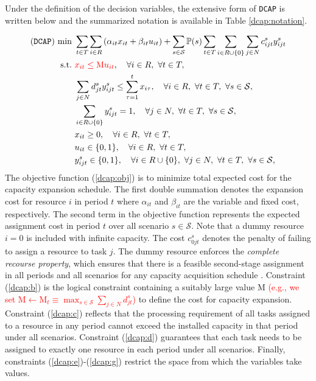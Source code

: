 Under the definition of the decision variables, the extensive form of \texttt{DCAP} is written below and the summarized notation is available in Table \ref{dcap:notation}.

\begin{subequations}
	\begin{align}
	(\texttt{DCAP})\ \textrm{min}\ &\sum_{t\in T}\sum_{i\in R}\left(\alpha_{it}x_{it}+\beta_{it}u_{it}\right)+\sum_{s\in\mathcal{S}}\PP(s)\sum_{t\in T}\sum_{i\in R\cup\{0\}}\sum_{j\in N}c_{ijt}^{s}y_{ijt}^s	\label{dcap:obj} \\
	\textrm{s.t.}\ & \textcolor{red}{x_{it}\le \textrm{M}u_{it}},\quad\forall i\in R,\ \forall t\in T,	\label{dcap:b}\\
	&\sum_{j\in N}d_{jt}^s y_{ijt}^s\le\sum_{\tau=1}^{t}x_{i\tau},\quad\forall i\in R,\ \forall t\in T,\ \forall s\in\mathcal{S},\label{dcap:c}\\
	&\sum_{i\in R\cup \{0\}}y_{ijt}^s=1,\quad\forall j\in N,\ \forall t\in T,\ \forall s\in\mathcal{S}, \label{dcap:d} \\
	&x_{it}\ge 0,\quad\forall i\in R,\ \forall t\in T,\label{dcap:e} \\
	&u_{it}\in\{0,1\}, \quad\forall i\in R,\ \forall t\in T,\label{dcap:f}\\
	&y_{ijt}^s\in\{0,1\},\quad\forall i\in R\cup\{0\},\ \forall j\in N,\ \forall t\in T,\ \forall s\in\mathcal{S},\label{dcap:g}
	\end{align}
\end{subequations}
The objective function (\ref{dcap:obj}) is to minimize total expected cost for the capacity expansion schedule. The first double summation denotes the expansion cost for resource $i$ in period $t$ where $\alpha_{it}$ and $\beta_{it}$ are the variable and fixed cost, respectively. The second term in the objective function represents the expected assignment cost in period $t$ over all scenario $s\in\mathcal{S}$. Note that a dummy resource $i=0$ is included with infinite capacity. The cost $c_{0jt}^s$ denotes the penalty of failing to assign a resource to task $j$. The dummy resource enforces the \textit{complete recourse property}, which ensures that there is a feasible second-stage assignment in all periods and all scenarios for any capacity acquisition schedule \cite{journal:AG2004}. Constraint (\ref{dcap:b}) is the logical constraint containing a suitably large value M \textcolor{red}{(e.g., we set $\textrm{M}\leftarrow \textrm{M}_{t}\equiv \max_{s\in\mathcal{S}} \sum_{j\in N} d_{jt}^s$)} to define the cost for capacity expansion. Constraint (\ref{dcap:c}) reflects that the processing requirement of all tasks assigned to a resource in any period cannot exceed the installed capacity in that period under all scenarios. Constraint (\ref{dcap:d}) guarantees that each task needs to be assigned to exactly one resource in each period under all scenarios. Finally, constraints (\ref{dcap:e})-(\ref{dcap:g}) restrict the space from which the variables take values.


